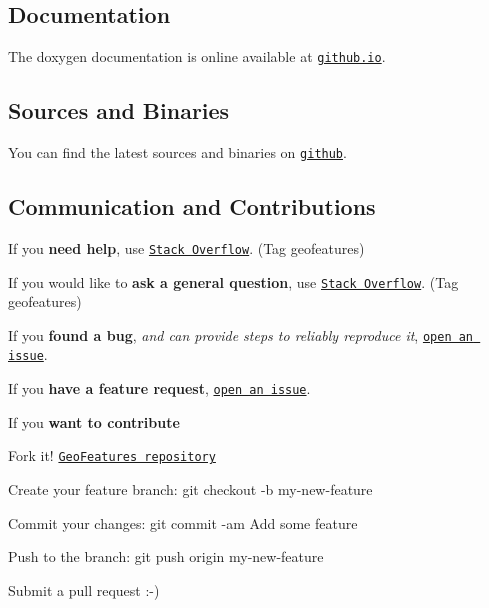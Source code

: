 \subsection*{Documentation}

The doxygen documentation is online available at \href{http://tonystone.github.io/geofeatures}{\tt github.\+io}.

\subsection*{Sources and Binaries}

You can find the latest sources and binaries on \href{https://github.com/tonystone/geofeatures}{\tt github}.

\subsection*{Communication and Contributions}


\begin{DoxyItemize}
\item If you {\bfseries need help}, use \href{http://stackoverflow.com/questions/tagged/geofeatures}{\tt Stack Overflow}. (Tag \textquotesingle{}geofeatures\textquotesingle{})
\item If you would like to {\bfseries ask a general question}, use \href{http://stackoverflow.com/questions/tagged/geofeatures}{\tt Stack Overflow}. (Tag \textquotesingle{}geofeatures\textquotesingle{})
\item If you {\bfseries found a bug}, {\itshape and can provide steps to reliably reproduce it}, \href{https://github.com/tonystone/geofeatures/issues}{\tt open an issue}.
\item If you {\bfseries have a feature request}, \href{https://github.com/tonystone/geofeatures/issues}{\tt open an issue}.
\item If you {\bfseries want to contribute}
\begin{DoxyItemize}
\item Fork it! \href{https://github.com/tonystone/geofeatures}{\tt Geo\+Features repository}
\item Create your feature branch\+: {\ttfamily git checkout -\/b my-\/new-\/feature}
\item Commit your changes\+: {\ttfamily git commit -\/am \textquotesingle{}Add some feature\textquotesingle{}}
\item Push to the branch\+: {\ttfamily git push origin my-\/new-\/feature}
\item Submit a pull request \+:-\/)
\end{DoxyItemize}
\end{DoxyItemize}

